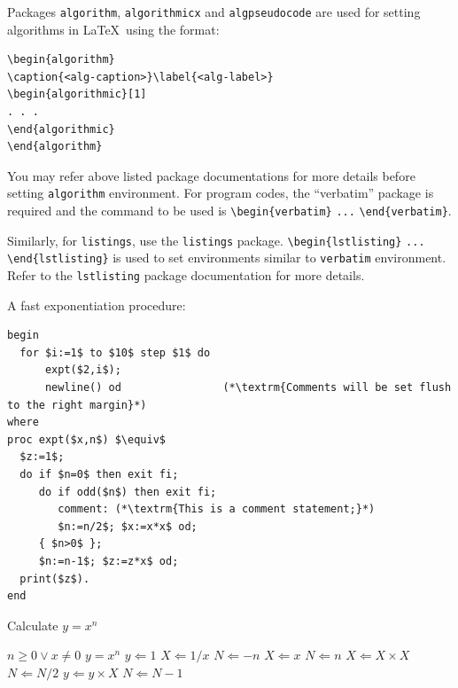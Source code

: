 \documentclass{article}
\begin{document}
Packages \verb+algorithm+, \verb+algorithmicx+ and \verb+algpseudocode+ are used for setting algorithms in \LaTeX\ using the format:

\bigskip
\begin{verbatim}
\begin{algorithm}
\caption{<alg-caption>}\label{<alg-label>}
\begin{algorithmic}[1]
. . .
\end{algorithmic}
\end{algorithm}
\end{verbatim}
\bigskip

You may refer above listed package documentations for more details before setting \verb+algorithm+ environment. For program codes, the ``verbatim'' package is required and the command to be used is \verb+\begin{verbatim}+ \verb+...+ \verb+\end{verbatim}+. 

Similarly, for \verb+listings+, use the \verb+listings+ package. \verb+\begin{lstlisting}+ \verb+...+ \verb+\end{lstlisting}+ is used to set environments similar to \verb+verbatim+ environment. Refer to the \verb+lstlisting+ package documentation for more details.

A fast exponentiation procedure:

\begin{lstlisting}
begin
  for $i:=1$ to $10$ step $1$ do
      expt($2,i$);  
      newline() od                (*\textrm{Comments will be set flush to the right margin}*)
where
proc expt($x,n$) $\equiv$
  $z:=1$;
  do if $n=0$ then exit fi;
     do if odd($n$) then exit fi;                 
        comment: (*\textrm{This is a comment statement;}*)
        $n:=n/2$; $x:=x*x$ od;
     { $n>0$ };
     $n:=n-1$; $z:=z*x$ od;
  print($z$). 
end
\end{lstlisting}

\begin{algorithm}
\caption{Calculate $y = x^n$}\label{algo1}
\begin{algorithmic}[1]
\Require $n \geq 0 \vee x \neq 0$
\Ensure $y = x^n$ 
\State $y \Leftarrow 1$
\label{algln2}
        \State $X \Leftarrow 1 / x$
        \State $N \Leftarrow -n$
\Else
        \State $X \Leftarrow x$
        \State $N \Leftarrow n$
\EndIf
{}
            \State $X \Leftarrow X \times X$
            \State $N \Leftarrow N / 2$
        \Else[$N$ is odd]
            \State $y \Leftarrow y \times X$
            \State $N \Leftarrow N - 1$
        \EndIf
\EndWhile
\end{algorithmic}
\end{algorithm}
\end{document}
